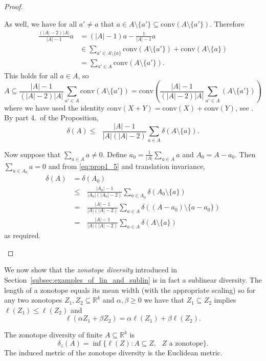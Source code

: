 \documentclass[11pt]{article}
\newcommand{\conv}{\mathrm{conv}}
\renewcommand{\Re}{\mathbb{R}}
\begin{document}
\begin{proof}
\begin{enumerate}
As well, we have for all $a' \neq a$ that  $a \in A \setminus \{a'\} \subseteq \conv(A \setminus \{a'\})$. Therefore
\begin{align*}
    \frac{(|A|-2)|A|}{|A|-1} a & = (|A|-1)a - \frac{1}{|A|-1}a \\
    & \in \sum_{a' \in A \setminus \{a\}} \conv(A \setminus \{a'\}) + \conv(A \setminus \{a\}) \\
    & = \sum_{a' \in A} \conv(A \setminus \{a'\}).
\end{align*}
This holds for all $a \in A$, so
\[  A \subseteq \frac{|A|-1}{(|A|-2)|A|}\sum_{a' \in A}\conv(A \setminus \{a'\}) = \conv\left(\frac{|A|-1}{(|A|-2)|A|}\sum_{a' \in A}(A \setminus \{a'\}) \right)\]
where we have used the identity $\conv(X+Y) = \conv(X) + \conv(Y)$, see \cite[Theorem~1.1.2]{Schneider14}. By part 4.~of the Proposition,
\begin{equation}\delta(A) \leq \mbox{ $\frac{|A|-1}{|A|(|A|-2)}$}\sum_{a \in A} \delta(A \setminus \{a\}). \label{eq:prop1_5}\end{equation}

Now suppose that  $\sum_{a \in A} a \neq 0$. Define $a_0 =  \frac{1}{|A|} \sum_{a \in A} a$ and  $A_0 = A - a_0$. Then $\sum_{a \in A_0} a = 0$ and from \eqref{eq:prop1_5} and translation invariance, 
\begin{align*}
    \delta(A) & = \delta(A_0) \\
    & \leq \mbox{ $\frac{|A_0|-1}{|A_0|(|A_0|-2)}$}\sum_{a \in A_0} \delta(A_0 \setminus \{a\}) \\
    & = \mbox{ $\frac{|A|-1}{|A|(|A|-2)}$}\sum_{a \in A} \delta((A-a_0) \setminus \{a-a_0\}) \\
    & = \mbox{ $\frac{|A|-1}{|A|(|A|-2)}$}\sum_{a \in A} \delta(A \setminus \{a\})
\end{align*}
as required.
\end{enumerate}
\end{proof}

We now show that the {\em zonotope diversity} introduced in Section~\ref{subsec:examples_of_lin_and_sublin} is in fact a sublinear diversity. The length of a zonotope equals its mean width (with the appropriate scaling) so for any two zonotopes $Z_1,Z_2 \subseteq \Re^k$ and $\alpha,\beta \geq 0$ we have that $Z_1 \subseteq Z_2$ implies $\ell(Z_1) \leq \ell(Z_2)$ and 
\[ \ell(\alpha Z_1 + \beta Z_2) = \alpha \ell(Z_1) + \beta \ell(Z_2).\]

The zonotope diversity of finite $A \subseteq \Re^k$ is 
\[\delta_z(A) = \inf\{\ell(Z): A \subseteq Z, \mbox{ $Z$ a zonotope}\}.\]
The induced metric of the zonotope diversity is the Euclidean metric.
\end{document}
